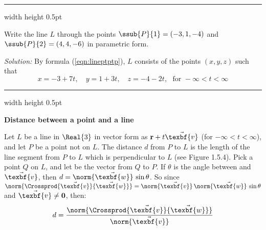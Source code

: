 \vspace{3mm}
\hrule width \textwidth height 0.5pt
\begin{exmp}\label{exmp:linethrupts}
 Write the line $L$ through the points $\ssub{P}{1} = (-3,1,-4)$ and $\ssub{P}{2} = (4,4,-6)$ in parametric
 form.\vspace{1mm}
 \par\noindent\emph{Solution:} By formula (\ref{eqn:lineptptp}), $L$ consists of the points $(x,y,z)$ such that
 \begin{displaymath}
  x = -3 + 7t, \quad y = 1 +3t, \quad z = -4 -2t, \text{~~for~} -\infty < t < \infty
 \end{displaymath}
\end{exmp}\vspace{-1mm}
\hrule width \textwidth height 0.5pt
\vspace{2mm}

\par\noindent\textbf{\large{Distance between a point and a line}}\normalsize\vspace{1.5mm}

\piccaption[]{}
Let $L$ be a line in $\Real{3}$ in vector form as $\textbf{r} + t \vec{\texbf{v}}$ (for $-\infty < t < \infty$), and
let $P$ be a point not on $L$. The distance $d$ from $P$ to $L$ is the length
of the line segment from $P$ to $L$ which is perpendicular to $L$ (see Figure 1.5.4).
Pick a point $Q$ on $L$, and let  be the vector from $Q$ to $P$. If $\theta$ is the angle between 
and $\vec{\texbf{v}}$, then $d = \norm{\vec{\texbf{w}}}\,\sin \theta$. So since
$\norm{\Crossprod{\vec{\texbf{v}}}{\vec{\texbf{w}}}} = \norm{\vec{\texbf{v}}}\,\norm{\vec{\texbf{w}}}\,\sin \theta$ and
$\vec{\texbf{v}} \ne \textbf{0}$, then:
\begin{equation}\label{eqn:distptline}
 d = \frac{\norm{\Crossprod{\vec{\texbf{v}}}{\vec{\texbf{w}}}}}{\norm{\vec{\texbf{v}}}}
\end{equation}

